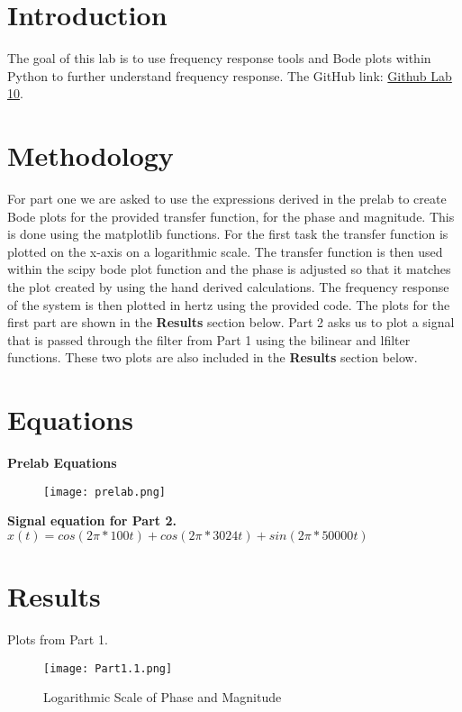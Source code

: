 \documentclass[12pt]{report}
\begin{document}
\section{Introduction}
The goal of this lab is to use frequency response tools and Bode plots within Python to further understand frequency response. 
\newline \newline The GitHub link: \href{https://github.com/CDJohnson279}{Github Lab 10}. 

\section{Methodology}
For part one we are asked to use the expressions derived in the prelab to create Bode plots for the provided transfer function, for the phase and magnitude. This is done using the matplotlib functions. For the first task the transfer function is plotted on the x-axis on a logarithmic scale. The transfer function is then used within the scipy bode plot function and the phase is adjusted so that it matches the plot created by using the hand derived calculations. The frequency response of the system is then plotted in hertz using the provided code. The plots for the first part are shown in the \textbf{Results} section below. 
Part 2 asks us to plot a signal that is passed through the filter from Part 1 using the bilinear and lfilter functions. These two plots are also included in the \textbf{Results} section below. 
\section{Equations}
\textbf{Prelab Equations} 
\begin{figure}[h!]
    \centering
    \texttt{[image: prelab.png]}
    \label{Prelab Equations}
\end{figure}\newline
\textbf{Signal equation for Part 2.}\newline
$x(t) = cos(2\pi *100t) + cos(2\pi *3024t) + sin(2\pi * 50000t)$

\section{Results}
Plots from Part 1.\newline 
\begin{figure}[h!]
    \centering
    \texttt{[image: Part1.1.png]}
    \caption{Logarithmic Scale of Phase and Magnitude }
    \label{Task 1}
\end{figure}
\end{document}
